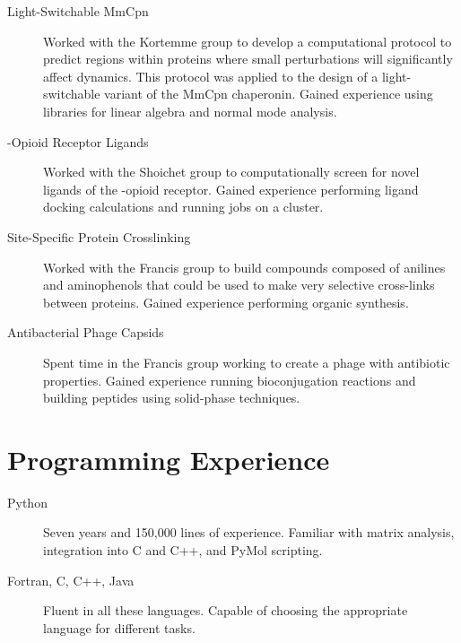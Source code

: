 \documentclass{article}
\begin{document}
  \begin{description}
   \item[Light-Switchable MmCpn] Worked with the Kortemme group to develop a 
   computational protocol to predict regions within proteins where small 
   perturbations will significantly affect dynamics.  This protocol was applied 
   to the design of a light-switchable variant of the MmCpn chaperonin.  Gained 
   experience using libraries for linear algebra and normal mode analysis.

   \item[\textkappa{}-Opioid Receptor Ligands] Worked with the Shoichet group 
   to computationally screen for novel ligands of the \textkappa{}-opioid 
   receptor.  Gained experience performing ligand docking calculations and 
   running jobs on a cluster.

   \item[Site-Specific Protein Crosslinking] Worked with the Francis group to 
   build compounds composed of anilines and aminophenols that could be used to 
   make very selective cross-links between proteins.  Gained experience 
   performing organic synthesis.

   \item[Antibacterial Phage Capsids] Spent time in the Francis
   group working to create a phage with antibiotic properties.  Gained
   experience running bioconjugation reactions and building peptides using
   solid-phase techniques.
  \end{description}

 \section*{Programming Experience}

  \begin{description}
   \item[Python] Seven years and 150,000 lines of experience.  Familiar with
   matrix analysis, integration into C and C++, and PyMol scripting.

   \item[Fortran, C, C++, Java] Fluent in all these languages.  Capable of 
   choosing the appropriate language for different tasks.
   \end{description}
\end{document}
